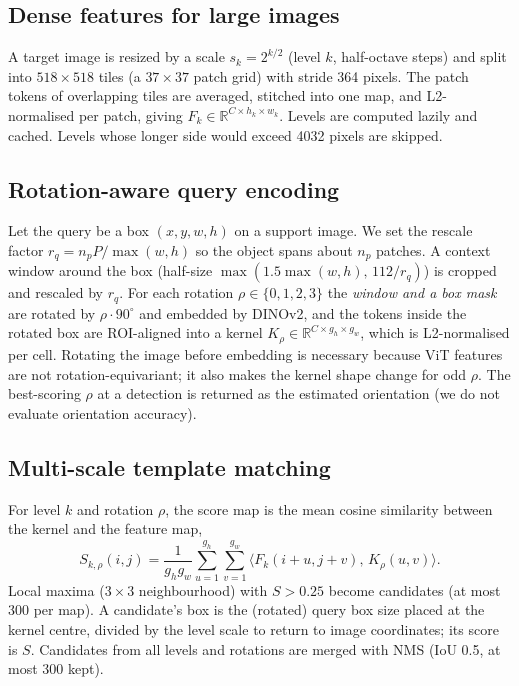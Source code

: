 \documentclass[10pt,twocolumn,letterpaper]{article}
\begin{document}
\subsection{Dense features for large images}
A target image is resized by a scale $s_k=2^{k/2}$ (level $k$, half-octave steps) and split into $518\times518$ tiles (a $37\times37$ patch grid) with stride 364 pixels. The patch tokens of overlapping tiles are averaged, stitched into one map, and L2-normalised per patch, giving $F_k\in\mathbb{R}^{C\times h_k\times w_k}$. Levels are computed lazily and cached. Levels whose longer side would exceed 4032 pixels are skipped.

\subsection{Rotation-aware query encoding}
Let the query be a box $(x,y,w,h)$ on a support image. We set the rescale factor $r_q = n_p P / \max(w,h)$ so the object spans about $n_p$ patches. A context window around the box (half-size $\max(1.5\max(w,h),\,112/r_q)$) is cropped and rescaled by $r_q$. For each rotation $\rho\in\{0,1,2,3\}$ the \emph{window and a box mask} are rotated by $\rho\cdot90^\circ$ and embedded by DINOv2, and the tokens inside the rotated box are ROI-aligned into a kernel $K_\rho\in\mathbb{R}^{C\times g_h\times g_w}$, which is L2-normalised per cell. Rotating the image before embedding is necessary because ViT features are not rotation-equivariant; it also makes the kernel shape change for odd $\rho$. The best-scoring $\rho$ at a detection is returned as the estimated orientation (we do not evaluate orientation accuracy).

\subsection{Multi-scale template matching}
For level $k$ and rotation $\rho$, the score map is the mean cosine similarity between the kernel and the feature map,
\begin{equation}
S_{k,\rho}(i,j)=\frac{1}{g_hg_w}\sum_{u=1}^{g_h}\sum_{v=1}^{g_w}\big\langle F_k(i+u,j+v),\,K_\rho(u,v)\big\rangle .
\end{equation}
Local maxima ($3\times3$ neighbourhood) with $S>0.25$ become candidates (at most 300 per map). A candidate's box is the (rotated) query box size placed at the kernel centre, divided by the level scale to return to image coordinates; its score is $S$. Candidates from all levels and rotations are merged with NMS (IoU 0.5, at most 300 kept).
\end{document}
